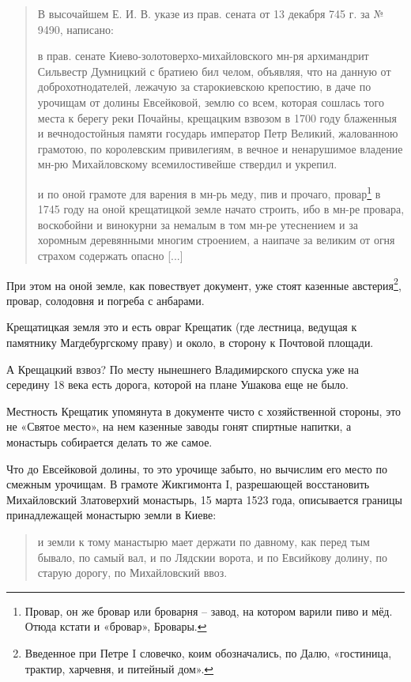 \begin{quotation}
В высочайшем Е. И. В. указе из прав. сената от 13 декабря 745 г. за № 9490, написано: 

в прав. сенате Киево-золотоверхо-михайлов\-ского мн-ря архимандрит Сильвестр Думницкий с братиею бил челом, объявляя, что на данную от доброхотнодателей, лежачую за старокиевскою крепостию, в даче по урочищам от долины Евсейковой, землю со всем, которая сошлась того места к берегу реки Почайны, крещацким взвозом в 1700 году блаженныя и вечнодостойныя памяти государь император Петр Великий, жалованною грамотою, по королевским привилегиям, в вечное и ненарушимое владение мн-рю Михайловскому всемилостивейше ствердил и укрепил. 

и по оной грамоте для варения в мн-рь меду, пив и прочаго, провар\footnote{Провар, он же бровар или броварня – завод, на котором варили пиво и мёд. Отюда кстати и «бровар», Бровары.} в 1745 году на оной крещатицкой земле начато строить, ибо в мн-ре провара, воскобойни и винокурни за немалым в том мн-ре утеснением и за хоромным деревянными многим строением, а наипаче за великим от огня страхом содержать опасно [...]
\end{quotation}

При этом на оной земле, как повествует документ, уже стоят казенные австерия\footnote{Введенное при Петре I словечко, коим обозначались, по Далю, «гостиница, трактир, харчевня,  и  питейный дом».}, провар, солодовня и погреба с анбарами.

Крещатицкая земля это и есть овраг Крещатик (где лестница, ведущая к памятнику Магдебургскому праву) и около, в сторону к Почтовой площади. 

А Крещацкий взвоз? По месту нынешнего Владимирского спуска уже на середину 18 века есть дорога, которой на плане Ушакова еще не было. 

Местность Крещатик упомянута в документе чисто с хозяйственной стороны, это не «Святое место», на нем казенные заводы гонят спиртные напитки, а монастырь собирается делать то же самое.

Что до Евсейковой долины, то это урочище забыто, но вычислим его место по смежным урочищам. В грамоте Жикгимонта I, разрешающей восстановить Михайловский Златоверхий монастырь, 15 марта 1523 года, описывается границы принадлежащей монастырю земли в Киеве:

\begin{quotation}
и земли к тому манастырю мает держати по давному, как перед тым бывало, по самый вал, и по Лядскии ворота, и по Евсийкову долину, по старую дорогу, по Михайловский ввоз.
\end{quotation}

